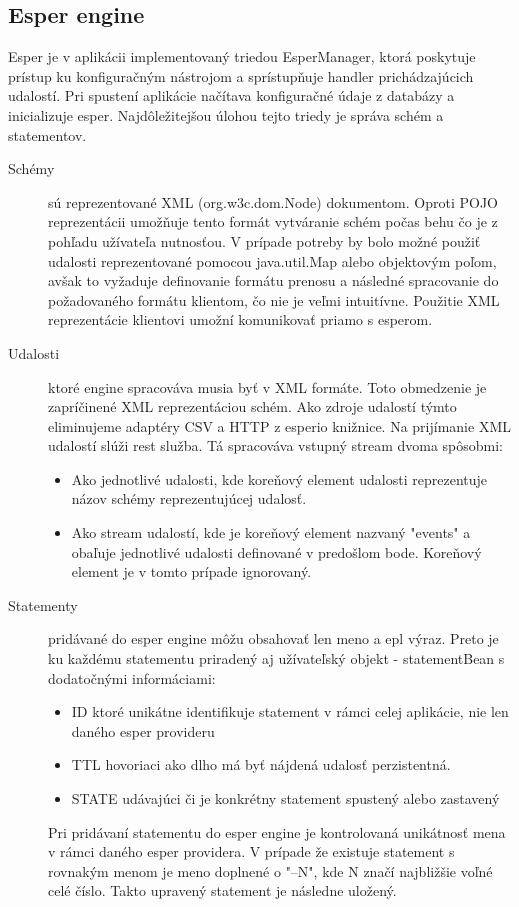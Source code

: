 	\subsection{Esper engine}
		Esper je v aplikácii implementovaný triedou EsperManager, ktorá poskytuje prístup ku konfiguračným nástrojom a sprístupňuje handler prichádzajúcich udalostí. Pri spustení aplikácie načítava konfiguračné údaje z databázy a inicializuje esper. Najdôležitejšou úlohou tejto triedy je správa schém a statementov.
		\begin{description}
			\item[Schémy] sú reprezentované XML (org.w3c.dom.Node) dokumentom. Oproti POJO reprezentácii umožňuje tento formát vytváranie schém počas behu čo je z pohľadu užívateľa nutnosťou. V prípade potreby by bolo možné použiť udalosti reprezentované pomocou java.util.Map alebo objektovým poľom, avšak to vyžaduje definovanie formátu prenosu a následné spracovanie do požadovaného formátu klientom, čo nie je veľmi intuitívne. Použitie XML reprezentácie klientovi umožní komunikovať priamo s esperom.
			
			\item[Udalosti] ktoré engine spracováva musia byť v XML formáte. Toto obmedzenie je zapríčinené XML reprezentáciou schém. Ako zdroje udalostí týmto eliminujeme adaptéry CSV a HTTP z esperio knižnice. Na prijímanie XML udalostí slúži rest služba. Tá spracováva vstupný stream dvoma spôsobmi:
			\begin{itemize}
				\item Ako jednotlivé udalosti, kde koreňový element udalosti reprezentuje názov schémy reprezentujúcej udalosť.
				\item Ako stream udalostí, kde je koreňový element nazvaný "events" a obaľuje jednotlivé udalosti definované v predošlom bode. Koreňový element je v tomto prípade ignorovaný.
			\end{itemize}
			
			\item[Statementy] pridávané do esper engine môžu obsahovať len meno a epl výraz. Preto je ku každému statementu priradený aj užívateľský objekt - statementBean s dodatočnými informáciami:
			\begin{itemize}
				\item ID ktoré unikátne identifikuje statement v rámci celej aplikácie, nie len daného esper provideru
				\item TTL hovoriaci ako dlho má byť nájdená udalosť perzistentná.
				\item STATE udávajúci či je konkrétny statement spustený alebo zastavený
			\end{itemize}
				
			
			Pri pridávaní statementu do esper engine je kontrolovaná unikátnosť mena v rámci daného esper providera. V prípade že existuje statement s rovnakým menom je meno doplnené o "--N", kde N značí najbližšie voľné celé číslo. Takto upravený statement je následne uložený.
		\end{description}
		

